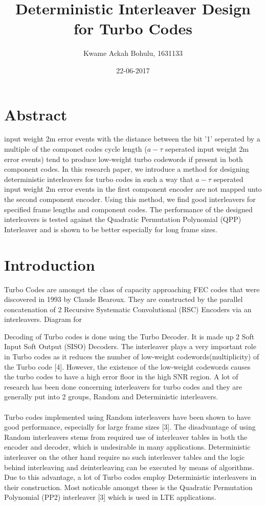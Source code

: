 \documentclass[20 pts]{article}
\title{Deterministic Interleaver Design for Turbo Codes}
\author{Kwame Ackah Bohulu, 1631133}
\date{22-06-2017}
\begin{document}
\maketitle
\newpage
\section{Abstract}
input weight 2m error events with the distance between the bit '1' seperated by a 
multiple of
the componet codes cycle length ($a-\tau$ seperated input weight 2m error events) 
tend to produce low-weight turbo codewords if present
in both component codes. In this research paper, we introduce a 
method for designing deterministic
interleavers for turbo codes in such a way that $a-\tau$ seperated input weight 2m 
error events in 
the first component encoder are not mapped unto the second component encoder. 
Using
this method, we find good interleavers for specified frame lengths and component 
codes. The performance of the designed interleavers is tested against the Quadratic 
Permutation Polynomial (QPP) Interleaver and is shown to be better especially for long
frame sizes.

\section{Introduction}
Turbo Codes are amongst the class of capacity approaching FEC codes that were 
discovered in 1993 by Claude Bearoux. They are constructed by the parallel 
concatenation of 2 Recursive Systematic Convolutional (RSC) Encoders via an 
interleavers. Diagram for 


Decoding of Turbo codes is done using the Turbo Decoder. It is made up 2 Soft 
Input Soft 
Output (SISO) Decoders.
The interleaver plays a very important role in Turbo codes as it reduces the number of
 low-weight codewords(multiplicity) of the Turbo code [4]. However, the existence of 
 the low-weight codewords causes the turbo codes to have a high error floor in the 
 high SNR region. A lot of research has been done concerning interleavers for 
 turbo codes and they are generally put into 2 groups, Random and 
 Deterministic interleavers.
\paragraph{}
Turbo codes implemented using Random interleavers have been shown to have good
 performance, especially for large frame sizes [3]. The disadvantage of using 
 Random interleavers stems from required use of interleaver tables in both the 
 encoder and decoder, which is undesirable in many applications. 
 Deterministic interleaver
  on the other hand require no such interleaver tables and the logic behind interleaving
   and deinterleaving can be executed by means of algorithms. Due to this advantage, 
   a lot of Turbo codes employ Deterministic interleavers in their construction. Most 
   noticable amongst these is the Quadratic Permutation Polynomial (PP2) 
   interleaver [3]
    which is used in LTE applications.
\end{document}
